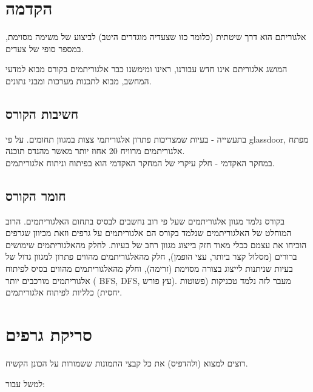 \section*{הקדמה}
\begin{displayquote}
אלגוריתם הוא דרך שיטתית (כלומר כזו שצעדיה מוגדרים היטב) לביצוע של משימה מסוימת, 
במספר סופי של צעדים.
\end{displayquote}
המושג אלגוריתם אינו חדש עבורנו, ראינו ומימשנו כבר אלגוריתמים בקורס מבוא למדעי המחשב, 
מבוא לתכנות מערכות ומבני נתונים.
\subsection*{חשיבות הקורס}
בתעשייה - בעיות שמצריכות פתרון אלגוריתמי צצות במגוון תחומים. על פי
\textenglish{glassdoor}, 
מפתח אלגוריתמים מרוויח 20 אחוז יותר מאשר מהנדס תוכנה.
\\
במחקר האקדמי - חלק עיקרי של המחקר האקדמי הוא בפיתוח וניתוח אלגוריתמים.
\subsection*{חומר הקורס}
בקורס נלמד מגוון אלגוריתמים שעל פי רוב נחשבים לבסיס בתחום האלגוריתמים.
הרוב המוחלט של האלגוריתמים שנלמד בקורס הם אלגוריתמים על גרפים 
וזאת מכיוון שגרפים הוכיחו את עצמם ככלי מאוד חזק בייצוג מגוון רחב של בעיות.
לחלק מהאלגוריתמים שימושים ברורים (מסלול קצר ביותר, עצי הופמן), 
חלק מהאלגוריתמים מהווים פתרון למגוון גדול של בעיות שניתנות לייצוג בצורה מסוימת (זרימה), 
וחלק מהאלגוריתמים מהווים בסיס לפיתוח אלגוריתמים מורכבים יותר (%
\textenglish{BFS},
\textenglish{DFS}, 
עץ פורש).
מעבר לזה נלמד טכניקות (פשוטות יחסית) כלליות לפיתוח אלגוריתמים.
\section*{סריקת גרפים}
\begin{example}
רוצים למצוא (ולהדפיס) את כל קבצי התמונות ששמורות על הכונן הקשיח.
\end{example}
למשל עבור:
\begin{center}
\end{center}


